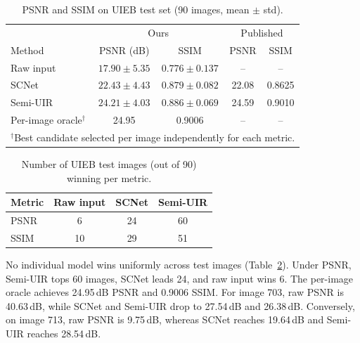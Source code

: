 \documentclass[runningheads]{llncs}
\begin{document}
\begin{table}[t]
    \centering
    \caption{PSNR and SSIM on UIEB test set (90 images, mean $\pm$ std).}
    \label{tab:uieb}
    \setlength{\tabcolsep}{4pt}
    \begin{tabular}{l c c c c}
        \toprule
                                                                   & \multicolumn{2}{c}{Ours}  & \multicolumn{2}{c}{Published}                  \\
        Method                                                     & PSNR (dB)                 & SSIM                          & PSNR  & SSIM   \\
        \midrule
        Raw input                                                  & $17.90 \pm 5.35$          & $0.776 \pm 0.137$             & --    & --     \\
        SCNet~\cite{fuUnderwaterImageEnhancement2022}              & $22.43 \pm 4.43$          & $0.879 \pm 0.082$             & 22.08 & 0.8625 \\
        Semi-UIR~\cite{huangContrastiveSemisupervisedLearning2023} & $\mathbf{24.21} \pm 4.03$ & $\mathbf{0.886} \pm 0.069$    & 24.59 & 0.9010 \\
        \midrule
        Per-image oracle$^{\dagger}$                               & 24.95                     & 0.9006                        & --    & --     \\
        \bottomrule
        \multicolumn{5}{l}{\footnotesize $^{\dagger}$Best candidate selected per image independently for each metric.}
    \end{tabular}
\end{table}

\begin{table}[t]
    \centering
    \caption{Number of UIEB test images (out of 90) winning per metric.}
    \label{tab:best}
    \begin{tabular}{l c c c}
        \toprule
        Metric & Raw input & SCNet & Semi-UIR \\
        \midrule
        PSNR   & 6         & 24    & 60       \\
        SSIM   & 10        & 29    & 51       \\
        \bottomrule
    \end{tabular}
\end{table}

No individual model wins uniformly across test images (Table~\ref{tab:best}). Under PSNR, Semi-UIR tops 60 images, SCNet leads 24, and raw input wins 6. The per-image oracle achieves 24.95\,dB PSNR and 0.9006 SSIM. For image 703, raw PSNR is 40.63\,dB, while SCNet and Semi-UIR drop to 27.54\,dB and 26.38\,dB. Conversely, on image 713, raw PSNR is 9.75\,dB, whereas SCNet reaches 19.64\,dB and Semi-UIR reaches 28.54\,dB.
\end{document}

